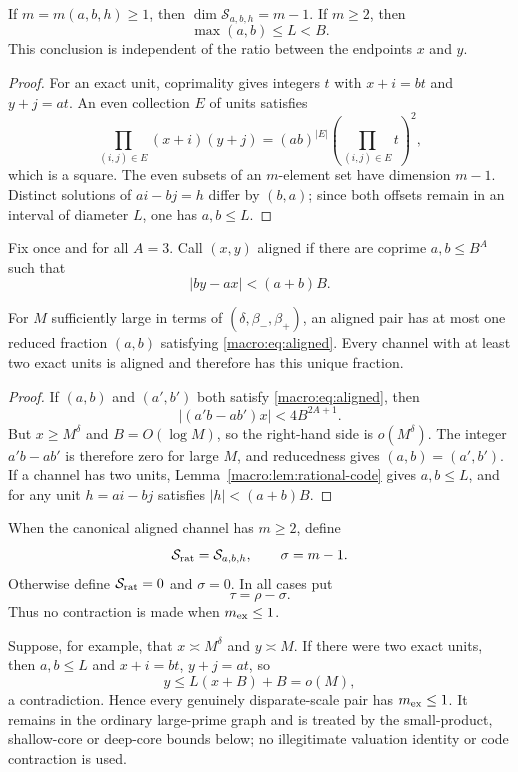 \begin{lemma}\label{macro:lem:rational-code}
If $m=m(a,b,h)\geq1$, then
$\dim\mathcal S_{a,b,h}=m-1$.  If $m\geq2$, then
\[
 \max(a,b)\leq L<B.
\]
This conclusion is independent of the ratio between the endpoints
$x$ and $y$.
\end{lemma}

\begin{proof}
For an exact unit, coprimality gives integers $t$ with
$x+i=bt$ and $y+j=at$.  An even collection $E$ of units satisfies
\[
 \prod_{(i,j)\in E}(x+i)(y+j)
 =(ab)^{|E|}\left(\prod_{(i,j)\in E}t\right)^2,
\]
which is a square.  The even subsets of an $m$-element set have
dimension $m-1$.  Distinct solutions of $ai-bj=h$ differ by
$(b,a)$; since both offsets remain in an interval of diameter $L$,
one has $a,b\leq L$.
\end{proof}

Fix once and for all $A=3$.  Call $(x,y)$ aligned if there are
coprime $a,b\leq B^A$ such that
\begin{equation}\label{macro:eq:aligned}
 |by-ax|<(a+b)B.
\end{equation}

\begin{lemma}\label{macro:lem:channel-unique}
For $M$ sufficiently large in terms of
$(\delta,\beta_-,\beta_+)$, an aligned pair has at most one reduced
fraction $(a,b)$ satisfying \eqref{macro:eq:aligned}.  Every channel with at
least two exact units is aligned and therefore has this unique
fraction.
\end{lemma}

\begin{proof}
If $(a,b)$ and $(a',b')$ both satisfy \eqref{macro:eq:aligned}, then
\[
 |(a'b-ab')x|<4B^{2A+1}.
\]
But $x\geq M^\delta$ and $B=O(\log M)$, so the right-hand side is
$o(M^\delta)$.  The integer $a'b-ab'$ is therefore zero for large
$M$, and reducedness gives $(a,b)=(a',b')$.  If a channel has two
units, Lemma~\ref{macro:lem:rational-code} gives $a,b\leq L$, and for any
unit $h=ai-bj$ satisfies $|h|<(a+b)B$.
\end{proof}

When the canonical aligned channel has $m\geq2$, define
\[
 \mathcal S_{\mathrm{rat}}=\mathcal S_{a,b,h},\qquad \sigma=m-1.
\]
Otherwise define $\mathcal S_{\mathrm{rat}}=0$ and $\sigma=0$.  In all cases put
\[
 \tau=\rho-\sigma.
\]
Thus no contraction is made when $m_{\rm ex}\leq1$.

\begin{remark}\label{macro:rem:disparate}
Suppose, for example, that $x\asymp M^\delta$ and $y\asymp M$.
If there were two exact units, then $a,b\leq L$ and
$x+i=bt$, $y+j=at$, so
\[
 y\leq L(x+B)+B=o(M),
\]
a contradiction.  Hence every genuinely disparate-scale pair has
$m_{\rm ex}\leq1$.  It remains in the ordinary large-prime graph and
is treated by the small-product, shallow-core or deep-core bounds below;
no illegitimate valuation identity or code contraction is used.
\end{remark}

